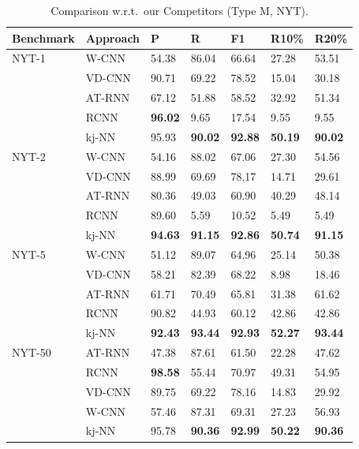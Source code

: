 \begin{table}
\renewrobustcmd{\boldmath}{}
    \centering
    \caption{Comparison w.r.t.\ our Competitors (Type M, NYT).}
    \label{result:nyt_typeB}
\addtolength{\tabcolsep}{-3pt}
    \centering
    \footnotesize
\renewcommand{\arraystretch}{0.45}
    \begin{tabularx}{\columnwidth}{@{}XXXXXXX@{}}
\toprule
Benchmark & Approach  & P     & R     & F1      & R10\%  & R20\%  \\ \midrule
NYT-1    & \gls{W-CNN}     & 54.38   & 86.04   & 66.64     & 27.28 & 53.51 \\
         & \gls{VD-CNN}    & 90.71   & 69.22   & 78.52     & 15.04 & 30.18 \\
          & \gls{AT-RNN}   & 67.12   & 51.88   & 58.52    & 32.92 & 51.34 \\
          & \gls{RCNN}      &\bfseries 96.02 & 9.65    & 17.54    & 9.55  & 9.55  \\
          & \gls{kj-NN}     & 95.93 &\bfseries	90.02 &\bfseries	92.88 &\bfseries	50.19 &\bfseries	90.02	 \\ \midrule
          
NYT-2    & \gls{W-CNN}     & 54.16   & 88.02 & 67.06 & 27.30 & 54.56 \\
         & \gls{VD-CNN}    & 88.99   & 69.69 & 78.17  & 14.71 & 29.61 \\
         &\gls{AT-RNN}   & 80.36   & 49.03 & 60.90 & 40.29 & 48.14 \\
         & \gls{RCNN}      & 89.60   & 5.59  & 10.52  & 5.49  & 5.49  \\
         & \gls{kj-NN}     &\bfseries 94.63 &\bfseries	91.15 &\bfseries	92.86 &\bfseries	50.74 &\bfseries	91.15 \\ \midrule
          
NYT-5   & \gls{W-CNN}     & 51.12 & 89.07 & 64.96 & 25.14 & 50.38 \\    
        & \gls{VD-CNN}    & 58.21 & 82.39 & 68.22 & 8.98  & 18.46 \\
        & \gls{AT-RNN}   & 61.71 & 70.49 & 65.81 & 31.38 & 61.62 \\
        & \gls{RCNN}      & 90.82 & 44.93 & 60.12 & 42.86 & 42.86 \\
        & \gls{kj-NN}     & \bfseries 92.43 &\bfseries	93.44 &\bfseries	92.93 &\bfseries	52.27 &\bfseries	93.44 \\ \midrule
          
NYT-50   & \gls{AT-RNN}   & 47.38 & 87.61 & 61.50 & 22.28 & 47.62 \\
          & \gls{RCNN}      & \bfseries98.58 & 55.44 & 70.97 & 49.31 & 54.95 \\
          & \gls{VD-CNN}    & 89.75 & 69.22 & 78.16 & 14.83 & 29.92 \\
          & \gls{W-CNN}     & 57.46 & 87.31 & 69.31 & 27.23 & 56.93 \\
          & \gls{kj-NN}     & 95.78 &\bfseries	90.36 &\bfseries	92.99 &\bfseries	50.22 &\bfseries	90.36 \\ \midrule
          

\end{tabularx}
\end{table}
